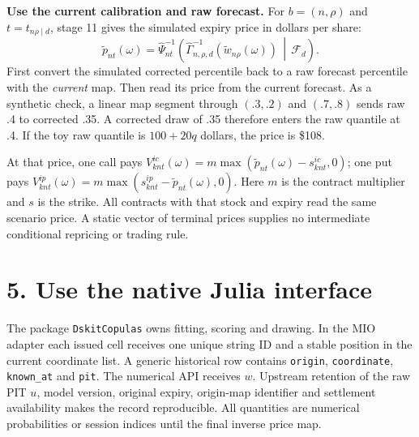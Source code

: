 \documentclass[11pt,letterpaper]{article}
\newcommand{\sect}[1]{\section*{\color{ink}#1}}
\newcommand{\lead}[1]{\textbf{\textcolor{accent}{#1}}}
\begin{document}
\lead{Use the current calibration and raw forecast.} For \(b=(n,\rho)\) and \(t=t_{n\rho\mid d}\), stage 11 gives the simulated expiry price in dollars per share:
\[
 \tilde p_{nt}(\omega)=\widehat\Psi_{nt}^{-1}
 \left(\widehat\Gamma_{n,\rho,d}^{-1}(\tilde w_{n\rho}(\omega))
 \,\middle|\,\mathcal F_d\right).
\]
First convert the simulated corrected percentile back to a raw forecast percentile with the \emph{current} map. Then read its price from the current forecast. As a synthetic check, a linear map segment through \((.3,.2)\) and \((.7,.8)\) sends raw .4 to corrected .35. A corrected draw of .35 therefore enters the raw quantile at .4. If the toy raw quantile is \(100+20q\) dollars, the price is \$108.

At that price, one call pays \(V^{ic}_{knt}(\omega)=m\max(\tilde p_{nt}(\omega)-s^{ic}_{knt},0)\); one put pays \(V^{ip}_{knt}(\omega)=m\max(s^{ip}_{knt}-\tilde p_{nt}(\omega),0)\). Here \(m\) is the contract multiplier and \(s\) is the strike. All contracts with that stock and expiry read the same scenario price. A static vector of terminal prices supplies no intermediate conditional repricing or trading rule.

\newpage
\sect{5. Use the native Julia interface}
The package \texttt{DskitCopulas} owns fitting, scoring and drawing. In the MIO adapter each issued cell receives one unique string ID and a stable position in the current coordinate list. A generic historical row contains \texttt{origin}, \texttt{coordinate}, \texttt{known\_at} and \texttt{pit}. The numerical API receives \(w\). Upstream retention of the raw PIT \(u\), model version, original expiry, origin-map identifier and settlement availability makes the record reproducible. All quantities are numerical probabilities or session indices until the final inverse price map.
\end{document}
